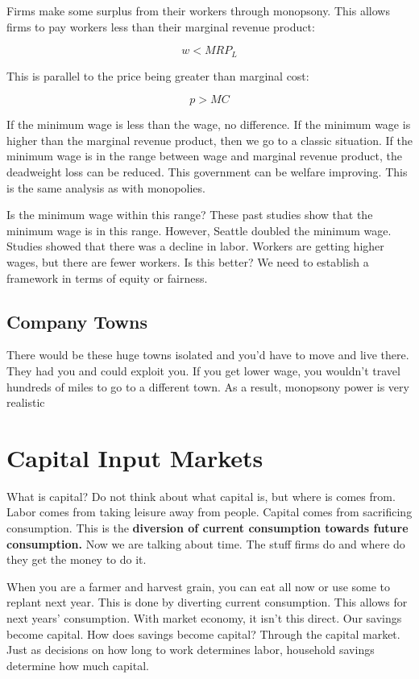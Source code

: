 \documentclass{article}
\begin{document}
Firms make some surplus from their workers through monopsony. This allows firms
to pay workers less than their marginal revenue product:

$$w<MRP_{L}$$

This is parallel to the price being greater than marginal cost:

$$p>MC$$

If the minimum wage is less than the wage, no difference. If the minimum wage is
higher than the marginal revenue product, then we go to a classic situation. If
the minimum wage is in the range between wage and marginal revenue product, the
deadweight loss can be reduced. This government can be welfare improving. This
is the same analysis as with monopolies.

Is the minimum wage within this range? These past studies show that the minimum
wage is in this range. However, Seattle doubled the minimum wage. Studies showed
that there was a decline in labor. Workers are getting higher wages, but there
are fewer workers. Is this better? We need to establish a framework in terms of
equity or fairness.

\subsection{Company Towns}

There would be these huge towns isolated and you'd have to move and live there.
They had you and could exploit you. If you get lower wage, you wouldn't travel
hundreds of miles to go to a different town. As a result, monopsony power is
very realistic

\section{Capital Input Markets}

What is capital? Do not think about what capital is, but where is comes from.
Labor comes from taking leisure away from people. Capital comes from sacrificing
consumption. This is the \textbf{diversion of current consumption towards future
consumption.} Now we are talking about time. The stuff firms do and where do
they get the money to do it.

When you are a farmer and harvest grain, you can eat all now or use some to
replant next year. This is done by diverting current consumption. This allows
for next years' consumption. With market economy, it isn't this direct. Our
savings become capital. How does savings become capital? Through the capital
market. Just as decisions on how long to work determines labor, household
savings determine how much capital.
\end{document}
